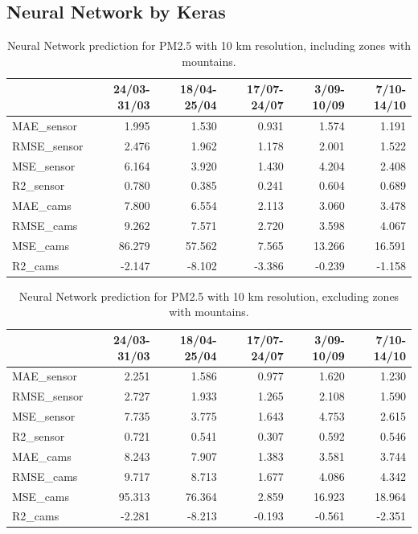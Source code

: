 \subsection{Neural Network by Keras}

\begin{table}[H]
\begin{tabular}{lrrrrr}
\toprule
  &  24/03-31/03 &  18/04-25/04 &  17/07-24/07 &  3/09-10/09 &  7/10-14/10 \\
\midrule
 MAE\_sensor &        1.995 &        1.530 &        0.931 &       1.574 &       1.191 \\
RMSE\_sensor &        2.476 &        1.962 &        1.178 &       2.001 &       1.522 \\
 MSE\_sensor &        6.164 &        3.920 &        1.430 &       4.204 &       2.408 \\
  R2\_sensor &        0.780 &        0.385 &        0.241 &       0.604 &       0.689 \\
   MAE\_cams &        7.800 &        6.554 &        2.113 &       3.060 &       3.478 \\
  RMSE\_cams &        9.262 &        7.571 &        2.720 &       3.598 &       4.067 \\
   MSE\_cams &       86.279 &       57.562 &        7.565 &      13.266 &      16.591 \\
    R2\_cams &       -2.147 &       -8.102 &       -3.386 &      -0.239 &      -1.158 \\
\bottomrule
\end{tabular}
\caption{Neural Network prediction for PM2.5 with 10 km resolution, including zones with mountains.}
\end{table}

\begin{table}[H]
\begin{tabular}{lrrrrr}
\toprule
  &  24/03-31/03 &  18/04-25/04 &  17/07-24/07 &  3/09-10/09 &  7/10-14/10 \\
\midrule
 MAE\_sensor &        2.251 &        1.586 &        0.977 &       1.620 &       1.230 \\
RMSE\_sensor &        2.727 &        1.933 &        1.265 &       2.108 &       1.590 \\
 MSE\_sensor &        7.735 &        3.775 &        1.643 &       4.753 &       2.615 \\
  R2\_sensor &        0.721 &        0.541 &        0.307 &       0.592 &       0.546 \\
   MAE\_cams &        8.243 &        7.907 &        1.383 &       3.581 &       3.744 \\
  RMSE\_cams &        9.717 &        8.713 &        1.677 &       4.086 &       4.342 \\
   MSE\_cams &       95.313 &       76.364 &        2.859 &      16.923 &      18.964 \\
    R2\_cams &       -2.281 &       -8.213 &       -0.193 &      -0.561 &      -2.351 \\
\bottomrule
\end{tabular}
\caption{Neural Network prediction for PM2.5 with 10 km resolution, excluding zones with mountains.}
\end{table}

